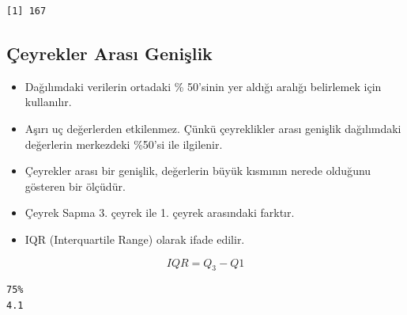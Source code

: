 \documentclass[
  letterpaper,
  DIV=11,
  numbers=noendperiod]{scrreprt}
\newenvironment{Shaded}{\begin{snugshade}}{\end{snugshade}}
\newcommand{\AttributeTok}[1]{\textcolor[rgb]{0.40,0.45,0.13}{#1}}
\newcommand{\CommentTok}[1]{\textcolor[rgb]{0.37,0.37,0.37}{#1}}
\newcommand{\ConstantTok}[1]{\textcolor[rgb]{0.56,0.35,0.01}{#1}}
\newcommand{\FloatTok}[1]{\textcolor[rgb]{0.68,0.00,0.00}{#1}}
\newcommand{\FunctionTok}[1]{\textcolor[rgb]{0.28,0.35,0.67}{#1}}
\newcommand{\NormalTok}[1]{\textcolor[rgb]{0.00,0.23,0.31}{#1}}
\newcommand{\OtherTok}[1]{\textcolor[rgb]{0.00,0.23,0.31}{#1}}
\newcommand{\SpecialCharTok}[1]{\textcolor[rgb]{0.37,0.37,0.37}{#1}}
\begin{document}
\begin{verbatim}
[1] 167
\end{verbatim}

\hypertarget{uxe7eyrekler-arasux131-geniux15flik}{%
\subsection*{Çeyrekler Arası
Genişlik}\label{uxe7eyrekler-arasux131-geniux15flik}}

\begin{itemize}
\item
  Dağılımdaki verilerin ortadaki \% 50'sinin yer aldığı aralığı
  belirlemek için kullanılır.
\item
  Aşırı uç değerlerden etkilenmez. Çünkü çeyreklikler arası genişlik
  dağılımdaki değerlerin merkezdeki \%50'si ile ilgilenir.
\item
  Çeyrekler arası bir genişlik, değerlerin büyük kısmının nerede
  olduğunu gösteren bir ölçüdür.
\item
  Çeyrek Sapma 3. çeyrek ile 1. çeyrek arasındaki farktır.
\item
  IQR (Interquartile Range) olarak ifade edilir.
\end{itemize}

\[IQR=Q_3-Q1\]

\begin{Shaded}
\end{Shaded}

\begin{verbatim}
75% 
4.1 
\end{verbatim}

\begin{Shaded}
\end{Shaded}
\end{document}
